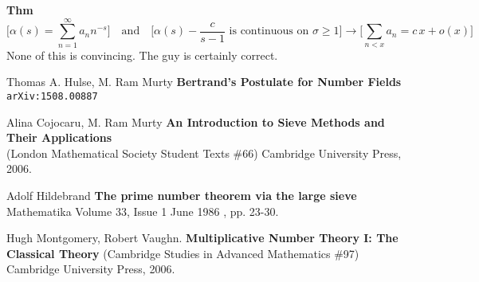 \documentclass[12pt]{article}
\begin{document}
\textbf{Thm}
$$ \bigg[ \alpha(s) = \sum_{n=1}^\infty a_n n^{-s} \bigg]\quad\text{and}\quad
\bigg[\alpha(s) - \frac{c}{s-1} \text{ is continuous on }\sigma\geq 1\bigg] \to \bigg[\sum_{n < x} a_n = c \, x + o(x)\bigg] $$ 
None of this is convincing.  The guy is certainly correct.
\vfill
\begin{thebibliography}{}

\item Thomas A. Hulse, M. Ram Murty \textbf{Bertrand's Postulate for Number Fields} \texttt{arXiv:1508.00887}

\item Alina Cojocaru, M. Ram Murty \textbf{An Introduction to Sieve Methods and Their Applications} \\ (London Mathematical Society Student Texts \#66) Cambridge University Press, 2006.

\item Adolf Hildebrand \textbf{The prime number theorem via the large sieve} Mathematika Volume 33, Issue 1 June 1986 , pp. 23-30.

\item Hugh Montgomery, Robert Vaughn. \textbf{Multiplicative Number Theory I: The Classical Theory} (Cambridge Studies in Advanced Mathematics \#97) Cambridge University Press, 2006.

\end{thebibliography}
\end{document}
